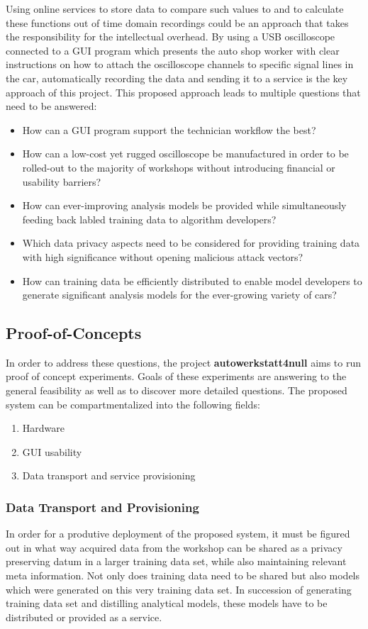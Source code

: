 Using online services to store data to compare such values to and to calculate these functions out of time domain recordings could be an approach that takes the responsibility for the intellectual overhead.
By using a USB oscilloscope connected to a GUI program which presents the auto shop worker with clear instructions on how to attach the oscilloscope channels to specific signal lines in the car, automatically recording the data and sending it to a service is the key approach of this project. 
This proposed approach leads to multiple questions that need to be answered:
\begin{itemize}
  \item How can a GUI program support the technician workflow the best?
  \item How can a low-cost yet rugged oscilloscope be manufactured in order to be rolled-out to the majority of workshops without introducing financial or usability barriers?
  \item How can ever-improving analysis models be provided while simultaneously feeding back labled training data to algorithm developers?
  \item Which data privacy aspects need to be considered for providing training data with high significance without opening malicious attack vectors?
  \item How can training data be efficiently distributed to enable model developers to generate significant analysis models for the ever-growing variety of cars?
\end{itemize}

\subsection{Proof-of-Concepts}
In order to address these questions, the project \textbf{autowerkstatt4null} aims to run proof of concept experiments.
Goals of these experiments are answering to the general feasibility as well as to discover more detailed questions.
The proposed system can be compartmentalized into the following fields:
\begin{enumerate}
  \item Hardware
  \item GUI usability
  \item Data transport and service provisioning 
\end{enumerate}

\subsubsection{Data Transport and Provisioning}
In order for a produtive deployment of the proposed system, it must be figured out in what way acquired data from the workshop can be shared as a privacy preserving datum in a larger training data set, while also maintaining relevant meta information.
Not only does training data need to be shared but also models which were generated on this very training data set.
In succession of generating training data set and distilling analytical models, these models have to be distributed or provided as a service.

